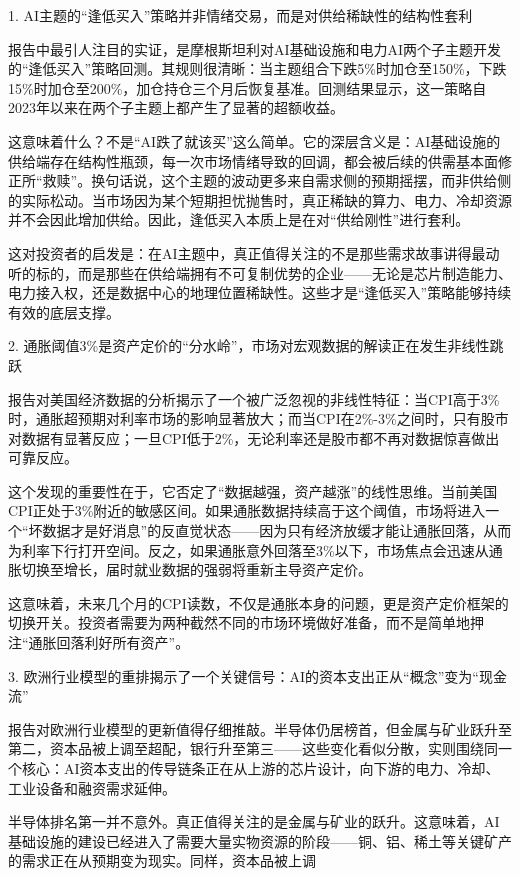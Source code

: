\documentclass[11pt]{ctexart}
\begin{document}
1. AI主题的“逢低买入”策略并非情绪交易，而是对供给稀缺性的结构性套利

报告中最引人注目的实证，是摩根斯坦利对AI基础设施和电力AI两个子主题开发的“逢低买入”策略回测。其规则很清晰：当主题组合下跌5\%时加仓至150\%，下跌15\%时加仓至200\%，加仓持仓三个月后恢复基准。回测结果显示，这一策略自2023年以来在两个子主题上都产生了显著的超额收益。

这意味着什么？不是“AI跌了就该买”这么简单。它的深层含义是：AI基础设施的供给端存在结构性瓶颈，每一次市场情绪导致的回调，都会被后续的供需基本面修正所“救赎”。换句话说，这个主题的波动更多来自需求侧的预期摇摆，而非供给侧的实际松动。当市场因为某个短期担忧抛售时，真正稀缺的算力、电力、冷却资源并不会因此增加供给。因此，逢低买入本质上是在对“供给刚性”进行套利。

这对投资者的启发是：在AI主题中，真正值得关注的不是那些需求故事讲得最动听的标的，而是那些在供给端拥有不可复制优势的企业——无论是芯片制造能力、电力接入权，还是数据中心的地理位置稀缺性。这些才是“逢低买入”策略能够持续有效的底层支撑。

2. 通胀阈值3\%是资产定价的“分水岭”，市场对宏观数据的解读正在发生非线性跳跃

报告对美国经济数据的分析揭示了一个被广泛忽视的非线性特征：当CPI高于3\%时，通胀超预期对利率市场的影响显著放大；而当CPI在2\%-3\%之间时，只有股市对数据有显著反应；一旦CPI低于2\%，无论利率还是股市都不再对数据惊喜做出可靠反应。

这个发现的重要性在于，它否定了“数据越强，资产越涨”的线性思维。当前美国CPI正处于3\%附近的敏感区间。如果通胀数据持续高于这个阈值，市场将进入一个“坏数据才是好消息”的反直觉状态——因为只有经济放缓才能让通胀回落，从而为利率下行打开空间。反之，如果通胀意外回落至3\%以下，市场焦点会迅速从通胀切换至增长，届时就业数据的强弱将重新主导资产定价。

这意味着，未来几个月的CPI读数，不仅是通胀本身的问题，更是资产定价框架的切换开关。投资者需要为两种截然不同的市场环境做好准备，而不是简单地押注“通胀回落利好所有资产”。

3. 欧洲行业模型的重排揭示了一个关键信号：AI的资本支出正从“概念”变为“现金流”

报告对欧洲行业模型的更新值得仔细推敲。半导体仍居榜首，但金属与矿业跃升至第二，资本品被上调至超配，银行升至第三——这些变化看似分散，实则围绕同一个核心：AI资本支出的传导链条正在从上游的芯片设计，向下游的电力、冷却、工业设备和融资需求延伸。

半导体排名第一并不意外。真正值得关注的是金属与矿业的跃升。这意味着，AI基础设施的建设已经进入了需要大量实物资源的阶段——铜、铝、稀土等关键矿产的需求正在从预期变为现实。同样，资本品被上调
\end{document}
